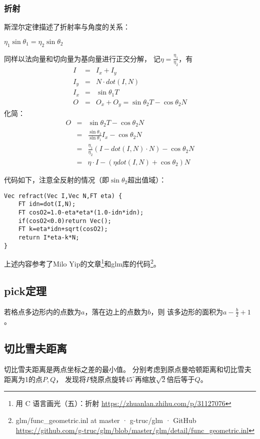 \subsubsection{折射}
斯涅尔定律描述了折射率与角度的关系：
\begin{theorem}
    $\eta_1\sin \theta_1=\eta_2\sin \theta_2$
\end{theorem}
同样以法向量和切向量为基向量进行正交分解，
记$\eta=\frac{\eta_1}{\eta_2}$，有
\begin{eqnarray*}
    I&=&I_x+I_y\\
    I_y&=&N\cdot dot(I,N)\\
    I_x&=&\sin \theta_1T\\
    O&=&O_x+O_y=\sin \theta_2T-\cos \theta_2N
\end{eqnarray*}
化简：
\begin{eqnarray*}
    O&=&\sin \theta_2T-\cos \theta_2N\\
    &=&\frac{\sin \theta_2}{\sin \theta_1}I_x - \cos \theta_2 N\\
    &=&\frac{\eta_1}{\eta_2}(I-dot(I,N)\cdot N)-\cos \theta_2 N\\
    &=&\eta\cdot I-(\eta dot(I,N)+\cos \theta_2)N
\end{eqnarray*}

代码如下，注意全反射的情况（即$\sin \theta_2$超出值域）：
\begin{lstlisting}
Vec refract(Vec I,Vec N,FT eta) {
    FT idn=dot(I,N);
    FT cosO2=1.0-eta*eta*(1.0-idn*idn);
    if(cosO2<0.0)return Vec();
    FT k=eta*idn+sqrt(cosO2);
    return I*eta-k*N;
}
\end{lstlisting}
上述内容参考了Milo Yip的文章\footnote{
    用 C 语言画光（五）：折射
    \url{https://zhuanlan.zhihu.com/p/31127076}
}和glm库的代码\footnote{
    glm/func\_geometric.inl at master · g-truc/glm · GitHub
    \url{https://github.com/g-truc/glm/blob/master/glm/detail/func\_geometric.inl}
}。
\subsection{pick定理}
\begin{theorem}
    若格点多边形内的点数为$a$，落在边上的点数为$b$，则
    该多边形的面积为$a-\frac{b}{2}+1$。
\end{theorem}
\subsection{切比雪夫距离}
切比雪夫距离是两点坐标之差的最小值。
分别考虑到原点曼哈顿距离和切比雪夫距离为1的点$P,Q$，
发现将$P$绕原点旋转$45^\circ$再缩放$\sqrt{2}$倍后等于$Q$。

